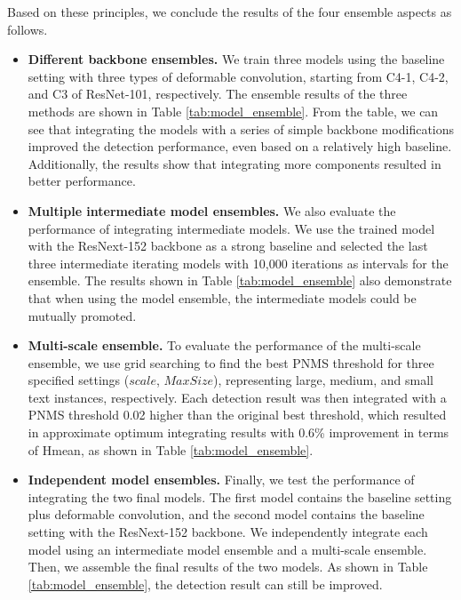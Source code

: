 Based on these principles, we conclude the results of the four ensemble aspects as follows.
\begin{itemize}
  \item {\bf Different backbone ensembles.} We train three models using the baseline setting with three types of deformable convolution, starting from C4-1, C4-2, and C3 of ResNet-101, respectively. The ensemble results of the three methods are shown in Table \ref{tab:model_ensemble}. From the table, we can see that integrating the models with a series of simple backbone modifications improved the detection performance, even based on a relatively high baseline. Additionally, the results show that integrating more components resulted in better performance.
  \item {\bf Multiple intermediate model ensembles.} We also evaluate the performance of integrating intermediate models. We use the trained model with the ResNext-152 backbone as a strong baseline and selected the last three intermediate iterating models with 10,000 iterations as intervals for the ensemble. The results shown in Table \ref{tab:model_ensemble} also demonstrate that when using the model ensemble, the intermediate models could be mutually promoted.
  \item {\bf Multi-scale ensemble.} To evaluate the performance of the multi-scale ensemble, we use grid searching to find the best PNMS threshold for three specified settings ($scale$, $MaxSize$), representing large, medium, and small text instances, respectively. Each detection result was then integrated with a PNMS threshold 0.02 higher than the original best threshold, which resulted in approximate optimum integrating results with 0.6\% improvement in terms of Hmean, as shown in Table \ref{tab:model_ensemble}. 
  \item {\bf Independent model ensembles.} Finally, we test the performance of integrating the two final models. The first model contains the baseline setting plus deformable convolution, and the second model contains the baseline setting with the ResNext-152 backbone. We independently integrate each model using an intermediate model ensemble and a multi-scale ensemble. Then, we assemble the final results of the two models. As shown in Table \ref{tab:model_ensemble}, the detection result can still be improved.
\end{itemize}

  
  
